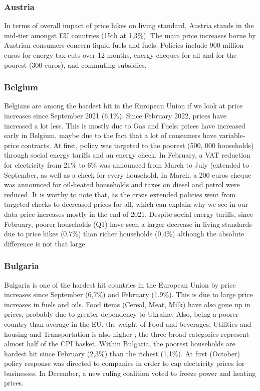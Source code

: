\documentclass[
  9pt,
  a4paper,
  DIV=11,
  numbers=noendperiod]{scrartcl}
\begin{document}
\hypertarget{austria}{%
\subsubsection{Austria}\label{austria}}

In terms of overall impact of price hikes on living standard, Austria
stands in the mid-tier amongst EU countries (15th at 1,3\%). The main
price increases borne by Austrian consumers concern liquid fuels and
fuels. Policies include 900 million euros for energy tax cuts over 12
months, energy cheques for all and for the poorest (300 euros), and
commuting subsidies.

\hypertarget{belgium}{%
\subsubsection{Belgium}\label{belgium}}

Belgians are among the hardest hit in the European Union if we look at
price increases since September 2021 (6,1\%). Since February 2022,
prices have increased a lot less. This is mostly due to Gas and Fuels:
prices have increased early in Belgium, maybe due to the fact that a lot
of consumers have variable-price contracts. At first, policy was
targeted to the poorest (500, 000 households) through social energy
tariffs and an energy check. In February, a VAT reduction for
electricity from 21\% to 6\% was announced from March to July (extended
to September, as well as a check for every household. In March, a 200
euros cheque was announced for oil-heated households and taxes on diesel
and petrol were reduced. It is worthy to note that, as the crisis
extended policies went from targeted checks to decreased prices for all,
which can explain why we see in our data price increases mostly in the
end of 2021. Despite social energy tariffs, since February, poorer
households (Q1) have seen a larger decrease in living standards due to
price hikes (0,7\%) than richer households (0,4\%) although the absolute
difference is not that large.

\hypertarget{bulgaria}{%
\subsubsection{Bulgaria}\label{bulgaria}}

Bulgaria is one of the hardest hit countries in the European Union by
price increases since September (6,7\%) and February (1.9\%). This is
due to large price increases in fuels and oils. Food items (Cereal,
Meat, Milk) have also gone up in prices, probably due to greater
dependency to Ukraine. Also, being a poorer country than average in the
EU, the weight of Food and beverages, Utilities and housing and
Transportation is also higher ; the three broad categories represent
almost half of the CPI basket. Within Bulgaria, the poorest households
are hardest hit since February (2,3\%) than the richest (1,1\%). At
first (October) policy response was directed to companies in order to
cap electricity prices for businesses. In December, a new ruling
coalition voted to freeze power and heating prices.
\end{document}
